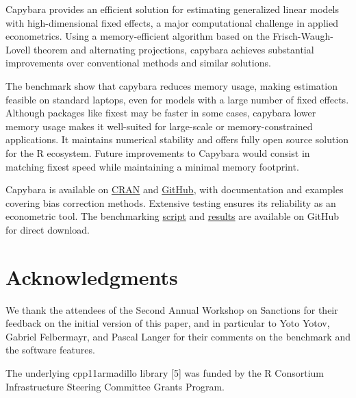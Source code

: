 \documentclass[
  10pt,
  letterpaper,
]{article}
\begin{document}
Capybara provides an efficient solution for estimating generalized
linear models with high-dimensional fixed effects, a major computational
challenge in applied econometrics. Using a memory-efficient algorithm
based on the Frisch-Waugh-Lovell theorem and alternating projections,
capybara achieves substantial improvements over conventional methods and
similar solutions.

The benchmark show that capybara reduces memory usage, making estimation
feasible on standard laptops, even for models with a large number of
fixed effects. Although packages like fixest may be faster in some
cases, capybara lower memory usage makes it well-suited for large-scale
or memory-constrained applications. It maintains numerical stability and
offers fully open source solution for the R ecosystem. Future
improvements to Capybara would consist in matching fixest speed while
maintaining a minimal memory footprint.

Capybara is available on
\href{https://cran.r-project.org/package=capybara}{CRAN} and
\href{https://github.com/pachadotdev/capybara}{GitHub}, with
documentation and examples covering bias correction methods. Extensive
testing ensures its reliability as an econometric tool. The benchmarking
\href{https://github.com/pachadotdev/capybara/blob/main/dev/article/benchmark-globalization.r}{script}
and
\href{https://github.com/pachadotdev/capybara/blob/main/dev/article/benchmark-globalization.csv}{results}
are available on GitHub for direct download.

\section{Acknowledgments}\label{acknowledgments}

We thank the attendees of the Second Annual Workshop on Sanctions for
their feedback on the initial version of this paper, and in particular
to Yoto Yotov, Gabriel Felbermayr, and Pascal Langer for their comments
on the benchmark and the software features.

The underlying cpp11armadillo library {[}5{]} was funded by the R
Consortium Infrastructure Steering Committee Grants Program.
\end{document}
